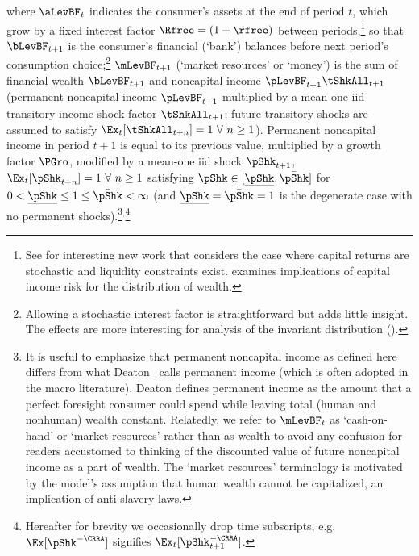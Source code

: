 \documentclass[BufferStockTheory]{subfiles}
\begin{document}
 where $\aLevBF_{t}$ indicates the consumer's assets at the end of period $t$, which grow by a fixed interest factor $\Rfree =(1+\rfree)$ between periods,\footnote{See \cite{mstCapIncFluct} for interesting new work that considers the case where capital returns are stochastic and liquidity constraints exist.  \cite{benhabibWealth} examines implications of capital income risk for the distribution of wealth.}  so that $\bLevBF_{t+1}$ is the consumer's financial (`bank') balances before next period's consumption choice;\footnote{Allowing a stochastic interest factor is straightforward but adds little insight.  The effects are more interesting for analysis of the invariant distribution (\cite{szeidlInvariant}).} $\mLevBF_{t+1}$ (`market resources' or `money') is the sum of financial wealth $\bLevBF_{t+1}$ and noncapital income $\pLevBF_{t+1}\tShkAll_{t+1}$ (permanent noncapital income $\pLevBF_{t+1}$ multiplied by a mean-one iid transitory income shock factor $\tShkAll_{t+1}$; future transitory shocks are assumed to satisfy $\Ex_{t}[{\tShkAll}_{t+n}]=1~\forall~n\geq 1$). Permanent noncapital income in period $t+1$ is equal to its previous value, multiplied by a growth factor $\PGro$, modified by a mean-one iid shock $\pShk_{t+1}$, $\Ex_{t}[{\pShk}_{t+n}]=1~\forall~n \geq 1$ satisfying $\pShk \in [\ushort{\pShk},\bar{\pShk}]$ for $0 < \ushort{\pShk} \leq 1 \leq \bar{\pShk} < \infty$ (and $\ushort{\pShk}=\bar{\pShk}=1$ is the degenerate case with no permanent shocks).\footnote{It is useful to emphasize that permanent noncapital income as defined here differs from what Deaton~\citeyearpar{deatonUnderstandingC} calls permanent income (which is often adopted in the macro literature).  Deaton defines permanent income as the amount that a perfect foresight consumer could spend while leaving total (human and nonhuman) wealth constant.  Relatedly, we refer to $\mLevBF_{t}$ as `cash-on-hand' or `market resources' rather than as wealth to avoid any confusion for readers accustomed to thinking of the discounted value of future noncapital income as a part of wealth.  The `market resources' terminology is motivated by the model's assumption that human wealth cannot be capitalized, an implication of anti-slavery laws.}$^{,}$\footnote{Hereafter for brevity we occasionally drop time subscripts, e.g.\ $\Ex[\pShk^{-\CRRA}]$ signifies $\Ex_{t}[\pShk_{t+1}^{-\CRRA}]$.}

\end{document}
